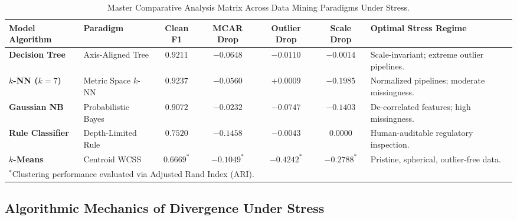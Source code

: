 \documentclass[11pt,a4paper]{article}
\begin{document}
\begin{table}[htbp]
    \centering
    \small
    \caption{Master Comparative Analysis Matrix Across Data Mining Paradigms Under Stress.}
    \label{tab:master_comparison}
    \setlength{\tabcolsep}{3.2pt}
    \begin{tabularx}{\linewidth}{@{} l >{\raggedright\arraybackslash}p{2.5cm} cccc >{\raggedright\arraybackslash}X @{}}
        \toprule
        \textbf{Model Algorithm} & \textbf{Paradigm} & \textbf{Clean F1} & \textbf{MCAR Drop} & \textbf{Outlier Drop} & \textbf{Scale Drop} & \textbf{Optimal Stress Regime} \\
        \midrule
        \textbf{Decision Tree} & Axis-Aligned Tree & $0.9211$ & $-0.0648$ & $\mathbf{-0.0110}$ & $\mathbf{-0.0014}$ & Scale-invariant; extreme outlier pipelines. \\
        \textbf{$k$-NN ($k=7$)} & Metric Space $k$-NN & $\mathbf{0.9237}$ & $-0.0560$ & $+0.0009$ & $\mathbf{-0.1985}$ & Normalized pipelines; moderate missingness. \\
        \textbf{Gaussian NB} & Probabilistic Bayes & $0.9072$ & $\mathbf{-0.0232}$ & $-0.0747$ & $-0.1403$ & De-correlated features; high missingness. \\
        \textbf{Rule Classifier} & Depth-Limited Rule & $0.7520$ & $-0.1458$ & $-0.0043$ & $0.0000$ & Human-auditable regulatory inspection. \\
        \textbf{$k$-Means} & Centroid WCSS & $0.6669^*$ & $-0.1049^*$ & $\mathbf{-0.4242^*}$ & $-0.2788^*$ & Pristine, spherical, outlier-free data. \\
        \bottomrule
        \multicolumn{7}{l}{\footnotesize $^*$Clustering performance evaluated via Adjusted Rand Index (ARI).}
    \end{tabularx}
\end{table}

\subsection{Algorithmic Mechanics of Divergence Under Stress}
\label{subsec:algorithmic_divergence}
\end{document}
